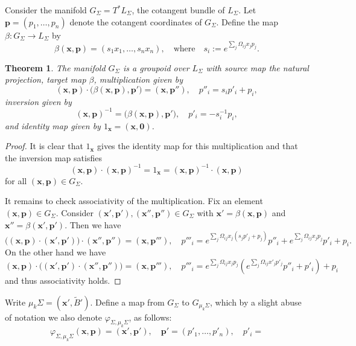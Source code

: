 \documentclass{amsart}
\newtheorem{theorem}{Theorem}[section]
\newcommand{\bfp}{\mathbf{p}}
\newcommand{\bfx}{\mathbf{x}}
\begin{document}
Consider the manifold $G_\Sigma=T^*L_\Sigma$, the cotangent bundle of $L_\Sigma$.
Let $\bfp=(p_1,\ldots,p_n)$ denote the cotangent coordinates of $G_\Sigma$.
Define the map $\beta:G_\Sigma\to L_\Sigma$ by 
\begin{equation}
  \label{eq:cluster groupoid target map}
  \beta(\bfx,\bfp)=(s_1x_1,\ldots,s_nx_n),\quad\text{where}\quad s_i:=e^{\sum_j\Omega_{ij}x_jp_j}.
\end{equation}
\begin{theorem}
  \label{th:cluster groupoid}
  The manifold $G_\Sigma$ is a groupoid over $L_\Sigma$ with source map the natural projection, target map $\beta$, multiplication given by
  \[(\bfx,\bfp)\cdot\big(\beta(\bfx,\bfp),\bfp'\big)=(\bfx,\bfp''),\quad p''_i=s_ip'_i+p_i,\]
  inversion given by
  \[(\bfx,\bfp)^{-1}=\big(\beta(\bfx,\bfp),\bfp'),\quad p'_i=-s_i^{-1}p_i,\]
  and identity map given by $1_\bfx=(\bfx,\boldsymbol{0})$.
\end{theorem}
\begin{proof}
  It is clear that $1_\bfx$ gives the identity map for this multiplication and that the inversion map satisfies 
  \[(\bfx,\bfp)\cdot(\bfx,\bfp)^{-1}=1_\bfx=(\bfx,\bfp)^{-1}\cdot(\bfx,\bfp)\]
  for all $(\bfx,\bfp)\in G_\Sigma$.

  It remains to check associativity of the multiplication.
  Fix an element $(\bfx,\bfp)\in G_\Sigma$.
  Consider $(\bfx',\bfp'),(\bfx'',\bfp'')\in G_\Sigma$ with $\bfx'=\beta(\bfx,\bfp)$ and $\bfx''=\beta(\bfx',\bfp')$.
  Then we have
  \[\big((\bfx,\bfp)\cdot(\bfx',\bfp')\big)\cdot(\bfx'',\bfp'')=(\bfx,\bfp'''),\quad p'''_i=e^{\sum_j\Omega_{ij}x_j(s_jp'_j+p_j)}p''_i+e^{\sum_j\Omega_{ij}x_jp_j}p'_i+p_i.\]
  On the other hand we have
  \[(\bfx,\bfp)\cdot\big((\bfx',\bfp')\cdot(\bfx'',\bfp'')\big)=(\bfx,\bfp'''),\quad p'''_i=e^{\sum_j\Omega_{ij}x_jp_j}(e^{\sum_j\Omega_{ij}x'_jp'_j}p''_i+p'_i)+p_i\]
  and thus associativity holds.
\end{proof}

Write $\mu_k\Sigma=(\bfx',\tilde B')$.  
Define a map from $G_\Sigma$ to $G_{\mu_k\Sigma}$, which by a slight abuse of notation we also denote $\varphi_{\Sigma,\mu_k\Sigma}$, as follows:
\begin{equation}
  \label{eq:groupoid gluing map}
  \varphi_{\Sigma,\mu_k\Sigma}(\bfx,\bfp)=(\bfx',\bfp'),\quad \bfp'=(p'_1,\ldots,p'_n),\quad p'_i=
\end{equation}
\end{document}
